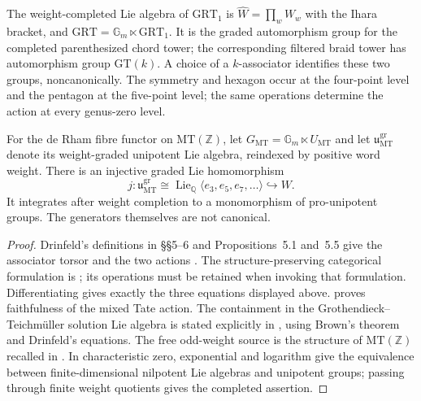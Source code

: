 The weight-completed Lie algebra of $\mathrm{GRT}_1$ is
$\widehat W=\prod_w W_w$ with the Ihara bracket, and
$\mathrm{GRT}=\mathbb G_m\ltimes\mathrm{GRT}_1$.
It is the graded automorphism group for the completed parenthesized
chord tower; the corresponding filtered braid tower has automorphism
group $\mathrm{GT}(k)$.  A choice of a $k$-associator identifies these
two groups, noncanonically.  The symmetry and hexagon occur at the
four-point level and the pentagon at the five-point level; the same
operations determine the action at every genus-zero level.

For the de Rham fibre functor on $\mathrm{MT}(\mathbb Z)$, let
$G_{\mathrm{MT}}=\mathbb G_m\ltimes U_{\mathrm{MT}}$ and let
$\mathfrak u_{\mathrm{MT}}^{\mathrm{gr}}$ denote its weight-graded
unipotent Lie algebra, reindexed by positive word weight.  There is an
injective graded Lie homomorphism
\[
 j:\mathfrak u_{\mathrm{MT}}^{\mathrm{gr}}
   \cong\operatorname{Lie}_{\mathbb Q}\langle e_3,e_5,e_7,\ldots\rangle
   \hookrightarrow W.
\]
It integrates after weight completion to a monomorphism of
pro-unipotent groups.  The generators themselves are not canonical.
\begin{proof}
Drinfeld's definitions in \S\S5--6 and Propositions~5.1 and~5.5
give the associator torsor and the two actions
\citep{Drinfeld1990}.  The structure-preserving categorical formulation
is \citet[Proposition~3.4, Theorems~1--3, Corollary~4.1]{BarNatan1998};
its operations must be retained when invoking that formulation.
Differentiating gives exactly the three equations displayed above.
\citet[Theorem~1.1 and its stated consequence, Conjecture~1]{Brown2012}
proves faithfulness of the mixed Tate action.  The containment in the
Grothendieck--Teichm\"uller solution Lie algebra is stated explicitly in
\citet[\S1.4.2]{Brown2021Depth}, using Brown's theorem and Drinfeld's
equations.  The free odd-weight source is the structure of
$\mathrm{MT}(\mathbb Z)$ recalled in \citet[\S1.1]{Brown2012}.
In characteristic zero, exponential and logarithm give the equivalence
between finite-dimensional nilpotent Lie algebras and unipotent groups;
passing through finite weight quotients gives the completed assertion.
\end{proof}

